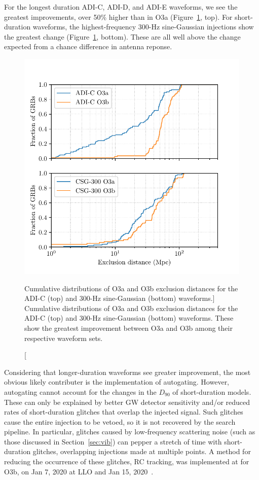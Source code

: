 For the longest duration ADI-C, ADI-D, and ADI-E waveforms, we see the greatest improvements, over 50\% higher than in O3a (Figure~\ref{fig:grb-o3b-compare-o3a}, top).
For short-duration waveforms, the highest-frequency 300-Hz sine-Gaussian injections show the greatest change (Figure~\ref{fig:grb-o3b-compare-o3a}, bottom).
These are all well above the change expected from a chance difference in antenna reponse.

\begin{figure}[h]
  \centering
  \includegraphics{figures/grb/compare-o3a.pdf}
  \caption
	[Cumulative distributions of O3a and O3b exclusion distances for the ADI-C (top) and 300-Hz sine-Gaussian (bottom) waveforms.]
	{Cumulative distributions of O3a and O3b exclusion distances for the ADI-C (top) and 300-Hz sine-Gaussian (bottom) waveforms.
	These show the greatest improvement between O3a and O3b among their respective waveform sets.}
  \label{fig:grb-o3b-compare-o3a}
\end{figure}

Considering that longer-duration waveforms see greater improvement, the most obvious likely contributer is the implementation of autogating.
However, autogating cannot account for the changes in the $D_{90}$ of short-duration models.
These can only be explained by better GW detector sensitivity and/or reduced rates of short-duration glitches that overlap the injected signal.
Such glitches cause the entire injection to be vetoed, so it is not recovered by the search pipeline.
In particular, glitches caused by low-frequency scattering noise (such as those discussed in Section~\ref{sec:vib}) can pepper a stretch of time with short-duration glitches, overlapping injections made at multiple points.
A method for reducing the occurrence of these glitches, \ac{RC} tracking, was implemented at for O3b, on Jan 7, 2020 at \ac{LLO} and Jan 15, 2020~\citep{Soni_2020}.

